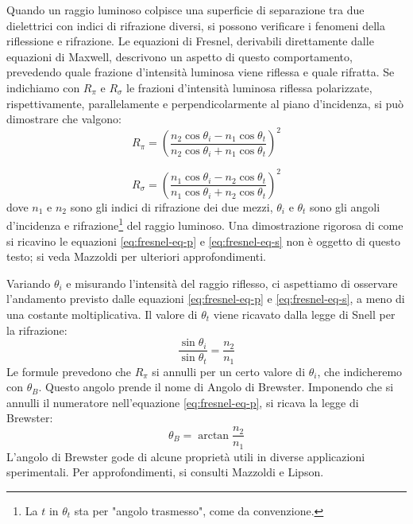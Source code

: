 Quando un raggio luminoso colpisce una superficie di separazione tra due
dielettrici con indici di rifrazione diversi, si possono verificare
i fenomeni della riflessione e rifrazione.
Le equazioni di Fresnel, derivabili direttamente dalle equazioni di Maxwell,
descrivono un aspetto di questo comportamento, prevedendo quale frazione d'intensità
luminosa viene riflessa e quale rifratta. Se indichiamo con $R_\pi$ e $R_\sigma$ le
frazioni d'intensità luminosa riflessa polarizzate, rispettivamente, parallelamente
e perpendicolarmente al piano d'incidenza, si può dimostrare che valgono:
%
\begin{equation}
  R_\pi =
  \left(
    \frac {
      n_2 \cos{\theta_i} - n_1 \cos{\theta_t}
    } {
      n_2 \cos{\theta_i} + n_1 \cos{\theta_t}
    }\right)^2
  \label{eq:fresnel-eq-p}
\end{equation}

\begin{equation}
  R_\sigma =
  \left(
    \frac {
      n_1 \cos{\theta_i} - n_2 \cos{\theta_t}
    } {
      n_1 \cos{\theta_i} + n_2 \cos{\theta_t}
    }
  \right)^2
  \label{eq:fresnel-eq-s}
\end{equation}
%
\noindent dove $n_1$ e $n_2$ sono gli indici di rifrazione dei due mezzi, $\theta_i$ e
$\theta_t$ sono gli angoli d'incidenza e rifrazione\footnote{La $t$ in $\theta_t$ sta per "angolo trasmesso", come da convenzione.} del raggio luminoso.
Una dimostrazione rigorosa di come si ricavino le equazioni \eqref{eq:fresnel-eq-p} e \eqref{eq:fresnel-eq-s} non è oggetto
di questo testo;
si veda Mazzoldi\cite{mazzoldi98} per ulteriori approfondimenti.

Variando $\theta_i$ e misurando l’intensità del raggio riflesso,
ci aspettiamo di osservare l'andamento previsto dalle equazioni \eqref{eq:fresnel-eq-p} e \eqref{eq:fresnel-eq-s}, a meno di una
costante moltiplicativa.
Il valore di $\theta_t$ viene ricavato dalla legge di Snell per la rifrazione:
%
\begin{equation}
  \frac {\sin{\theta_i}} {\sin{\theta_t}} = \frac {n_2} {n_1}
  \label{eq:legge-snell}
\end{equation}
%
\noindent Le formule prevedono che $R_\pi$ si annulli per un certo valore di $\theta_i$,
che indicheremo con $\theta_B$.
Questo angolo prende il nome di Angolo di Brewster. Imponendo che si annulli il
numeratore nell'equazione \eqref{eq:fresnel-eq-p}, si ricava la legge di Brewster:
%
\begin{equation}
  \theta_B = \arctan{
    \frac {n_2} {n_1}
  }\label{eq:legge-brewster}
\end{equation}
%
\noindent  L’angolo di Brewster gode di alcune proprietà utili in diverse applicazioni
sperimentali.
Per approfondimenti, si consulti Mazzoldi\cite{mazzoldi98} e Lipson\cite{lipson20}.
\endinput
